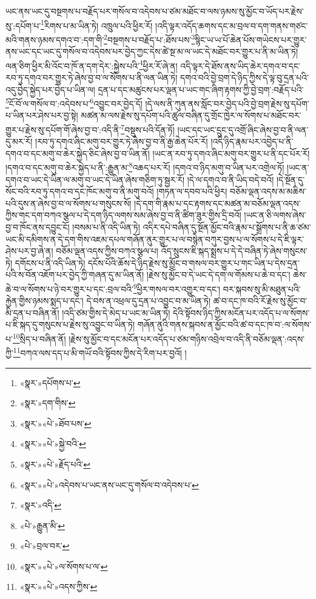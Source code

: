 ཡང་ནས་ཡང་དུ་བསྔགས་པ་བརྗོད་པར་གསོལ་བ་འདེབས་པ་ཙམ་མཐོང་བ་ལས་ཉམས་སུ་མྱོང་བ་ཡོད་པར་རྗེས་སུ་:དཔོག་པ་\footnote{«སྣར་»དཔོགས་པ་}རིགས་པ་མ་ཡིན་ཏེ། འཁྲུལ་པའི་ཕྱིར་རོ། །འདི་ལྟར་འདོད་ཆགས་དང་མ་བྲལ་བ་དག་གནས་གཙང་མའི་གནས་ཉམས་དགའ་བ་:དག་གི་\footnote{«སྣར་»དག་གིས་}བསྔགས་པ་བརྗོད་པ་:ཐོས་པས་\footnote{«སྣར་»«པེ་»ཐོབ་པས་}སྙིང་ཡ་ཡ་པོ་ཆེན་པོས་གཡེངས་པར་གྱུར་ནས་ཡང་དང་ཡང་དུ་གསོལ་བ་འདེབས་པར་བྱེད་ཀྱང་དེས་ཚེ་སྔ་མ་ལ་ཡང་དེ་མཐོང་བར་གྱུར་པ་ནི་མ་ཡིན་ཏེ། ལན་ཅིག་ཕྱིར་མི་འོང་བ་ཁོ་ན་དག་དེར་:སྐྱེས་པའི་\footnote{«སྣར་»«པེ་»སྐྱེ་བའི་}ཕྱིར་རོ་ཞེ་ན། འདི་ལྟར་དེ་ཐོས་ནས་ཡིད་ཆེར་དགའ་བ་དང་རབ་ཏུ་དགའ་བར་གྱུར་ཏེ་ཞེས་བྱ་བ་ལ་སོགས་པ་ནི་ལན་ཡིན་ཏེ། དགའ་བའི་བྱེ་བྲག་དེ་ཉིད་ཀྱིས་དེ་ལྟ་བུ་དྲན་པའི་འདུ་བྱེད་སྐྱེད་པར་བྱེད་པ་ཡིན་ལ། དྲན་པ་དང་མཚུངས་པར་ལྡན་པ་ཡང་གང་ཞིག་རྟགས་ཀྱི་བྱེ་བྲག་:བརྗོད་པའི་\footnote{«སྣར་»«པེ་»རྗོད་པའི་}ངོ་བོ་ལ་གསོལ་བ་:འདེབས་པ་\footnote{«སྣར་»«པེ་»འདེབས་པ་ཡང་ནས་ཡང་དུ་གསོལ་བ་འདེབས་པ་}འབྱུང་བར་བྱེད་དོ། །དེ་ལས་ནི་ཀུན་ནས་སློང་བར་བྱེད་པའི་བྱེ་བྲག་རྗེས་སུ་དཔོག་པ་ཡིན་པར་ཤེས་པར་བྱ་སྟེ། མཚན་མ་ལས་རྗེས་སུ་དཔོག་པའི་ཚུལ་བཞིན་དུ་གྲོང་ཁྱེར་ལ་སོགས་པ་མཐོང་བར་གྱུར་པ་རྗེས་སུ་དཔོག་གོ་ཞེས་བྱ་བ་:འདི་ནི་\footnote{«སྣར་»འདི་}བསྡུས་པའི་དོན་ཏོ། །ཡང་དང་ཡང་དྲུང་དུ་འགྲོ་ཞིང་ཞེས་བྱ་བ་ནི་ལན་དུ་མར་རོ། །རབ་ཏུ་དགའ་ཞིང་མགུ་བར་གྱུར་ཏེ་ཞེས་བྱ་བ་ནི་རྒྱ་ཆེན་པོར་རོ། །འདི་ཉིད་རྣམ་པར་འབྱེད་པ་ནི་དགའ་བ་དང་མགུ་བ་ཆེར་སྐྱེད་ཅིང་ཞེས་བྱ་བ་ཡིན་ནོ། །ཡང་ན་རབ་ཏུ་དགའ་ཞིང་མགུ་བར་གྱུར་པ་ནི་དང་པོར་རོ། །དགའ་བ་དང་མགུ་བ་ཆེར་སྐྱེད་པ་ནི་:རྒྱུན་མ་\footnote{«པེ་»རྒྱུན་མི་}འཆད་པར་རོ། །དགའ་བ་ཉིད་མགུ་བ་ཡིན་པར་འགྲེལ་ཏོ། །ཡང་ན་དགའ་བ་ཡང་དེ་ཡིན་ལ་མགུ་བ་ཡང་དེ་ཡིན་ཞེས་གཅིག་ཏུ་སྦྱར་རོ། །དེ་ལ་དགའ་བ་ནི་ཡིད་བདེ་བའོ། །དེ་སྔོན་དུ་སོང་བའི་རབ་ཏུ་དགའ་བ་དང་ཁོང་མགུ་བ་ནི་མགུ་བའོ། །གཏན་ལ་དབབ་པའི་ཕྱིར། བཅོམ་ལྡན་འདས་མ་མཆིས་པའི་དུས་ན་ཞེས་བྱ་བ་ལ་སོགས་པ་གསུངས་སོ། །དེ་དག་གི་རྣམ་པ་དང་རྟགས་དང་མཚན་མ་བཅོམ་ལྡན་འདས་ཀྱིས་གང་དག་བཀའ་སྩལ་པ་དེ་དག་ཉིད་ལགས་སམ་ཞེས་བྱ་བ་ནི་ཚིག་ཟུར་གྱིས་དྲི་བའོ། །ཡང་ན་ཅི་ལགས་ཞེས་བྱ་བ་ཁོང་ནས་དབྱུང་ངོ། །བསམ་པ་ནི་འདི་ཡིན་ཏེ། འདིར་དཔེ་བཞིན་དུ་སྔོན་མྱོང་བའི་རྣམ་པ་སྒྲོགས་པ་ནི་ཆ་ཙམ་ཡང་མི་དམིགས་ན་དེ་དག་གིས་འཇམ་དཔལ་གཞོན་ནུར་གྱུར་པ་ལ་བསྙེན་བཀུར་བྱས་པ་ལ་སོགས་པ་དེ་ཇི་ལྟར་ཤེས་པར་བྱ་ཞེ་ན། བཅོམ་ལྡན་འདས་ཀྱིས་བཀའ་སྩལ་པ། འོད་སྲུངས་ཇི་སྐད་སྨྲས་པ་དེ་དེ་བཞིན་ཏེ་ཞེས་གསུངས་ཏེ། དགོངས་པ་ནི་འདི་ཡིན་ཏེ། དངོས་པོའི་ཆོས་དེ་ཉིད་རྗེས་སུ་མྱོང་བ་གསལ་བར་གྱུར་པ་གང་ཡིན་པ་དེས་དྲན་པའི་ས་བོན་འཇོག་པར་བྱེད་ཀྱི་གཞན་དུ་མ་ཡིན་ནོ། །རྗེས་སུ་མྱོང་བ་དེ་ཡང་དེ་དག་ལ་གོམས་པ་ཆེ་བ་དང་། ཆེས་ཆེ་བ་ལ་སོགས་པ་ཉེ་བར་གྱུར་པ་དང་:བྲལ་བའི་\footnote{«པེ་»བྲལ་བར་}ཕྱིར་གསལ་བར་འགྱུར་བ་དང་། བར་སྐབས་སུ་མི་མཐུན་པའི་རྐྱེན་གྱིས་ཉམས་སྨད་པ་དང་། དེ་བས་ན་འཕྲལ་དུ་དྲན་པ་འབྱུང་བ་མ་ཡིན་ཏེ། ཚ་བ་དང་ཁ་བའི་རོ་རྗེས་སུ་མྱོང་བ་མི་དྲན་པ་བཞིན་ནོ། །འདི་ཙམ་གྱིས་དེ་མེད་པ་ཡང་མ་ཡིན་ཏེ། དེའི་སྟོབས་ཉིད་ཀྱིས་མངོན་པར་འདོད་པ་ལ་སོགས་པ་ཇི་སྐད་དུ་གསུངས་པ་རྗེས་སུ་འབྱུང་བ་ཡིན་ཏེ། གཞོན་ནུའི་གནས་སྐབས་ན་མྱོང་བའི་ཚ་བ་དང་ཁ་བ་:ལ་སོགས་པ་\footnote{«སྣར་»«པེ་»ལ་སོགས་པ་ལ་}སྲིད་པ་བཞིན་ནོ། །རྗེས་སུ་མྱོང་བ་དང་མངོན་པར་འདོད་པ་ཙམ་གཉིས་འབྲེལ་བ་འདི་ནི་བཅོམ་ལྡན་:འདས་ཀྱི་\footnote{«སྣར་»«པེ་»འདས་ཀྱིས་}བཀའ་ལས་དད་པ་མི་གཡོ་བའི་སྟོབས་ཀྱིས་དེ་རིག་པར་བྱའོ། །
